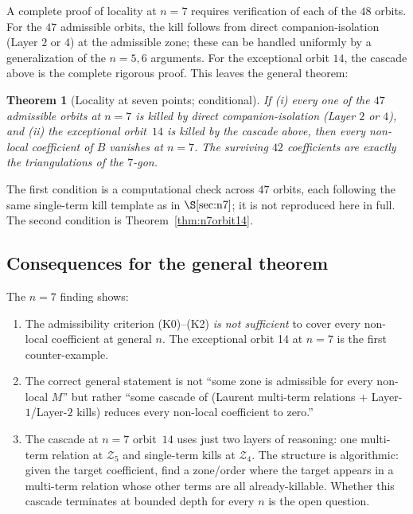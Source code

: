 \documentclass[11pt]{article}
\newtheorem{theorem}{Theorem}
\newcommand{\Zr}{\mathcal{Z}}
\begin{document}
A complete proof of locality at $n=7$ requires verification of each of
the $48$ orbits. For the $47$ admissible orbits, the kill follows from
direct companion-isolation (Layer $2$ or $4$) at the admissible zone;
these can be handled uniformly by a generalization of the $n=5,6$
arguments. For the exceptional orbit $14$, the cascade above is the
complete rigorous proof. This leaves the general theorem:

\begin{theorem}[Locality at seven points; conditional]
\label{thm:loc7}
If (i) every one of the $47$ admissible orbits at $n=7$ is killed by
direct companion-isolation (Layer $2$ or $4$), and (ii) the exceptional
orbit~$14$ is killed by the cascade above, then every non-local
coefficient of $B$ vanishes at $n=7$. The surviving $42$ coefficients
are exactly the triangulations of the $7$-gon.
\end{theorem}

The first condition is a computational check across $47$ orbits, each
following the same single-term kill template as in $\S\ref{sec:n7}$; it
is not reproduced here in full. The second condition is
Theorem~\ref{thm:n7orbit14}.

\subsection{Consequences for the general theorem}

The $n=7$ finding shows:
\begin{enumerate}\setlength\itemsep{0pt}
\item The admissibility criterion (K0)--(K2) \emph{is not sufficient}
  to cover every non-local coefficient at general $n$. The
  exceptional orbit 14 at $n=7$ is the first counter-example.
\item The correct general statement is not ``some zone is admissible
  for every non-local $M$'' but rather ``some cascade of (Laurent
  multi-term relations + Layer-$1$/Layer-$2$ kills) reduces every
  non-local coefficient to zero.''
\item The cascade at $n=7$ orbit~$14$ uses just two layers of
  reasoning: one multi-term relation at $\Zr_5$ and single-term kills
  at $\Zr_4$. The structure is algorithmic: given the target
  coefficient, find a zone/order where the target appears in a
  multi-term relation whose other terms are all already-killable.
  Whether this cascade terminates at bounded depth for every $n$ is
  the open question.
\end{enumerate}
\end{document}
